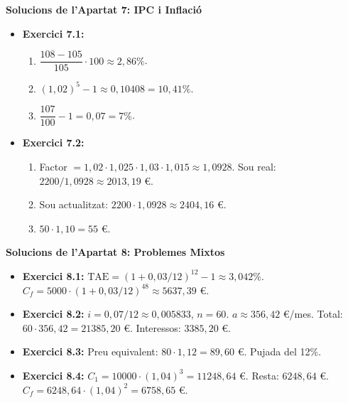 \documentclass[12pt]{article}
\begin{document}
\begin{solucio}
\textbf{Solucions de l'Apartat 7: IPC i Inflació}
\begin{itemize}
    \item \textbf{Exercici 7.1:}
    \begin{enumerate}[label=\alph*)]
        \item $\dfrac{108-105}{105} \cdot 100 \approx 2{,}86\%$.
        \item $(1{,}02)^5 - 1 \approx 0{,}10408 = 10{,}41\%$.
        \item $\dfrac{107}{100} - 1 = 0{,}07 = 7\%$.
    \end{enumerate}
    \item \textbf{Exercici 7.2:}
    \begin{enumerate}[label=\alph*)]
        \item Factor $= 1{,}02 \cdot 1{,}025 \cdot 1{,}03 \cdot 1{,}015 \approx 1{,}0928$. Sou real: $2200/1{,}0928 \approx 2013{,}19$ €.
        \item Sou actualitzat: $2200 \cdot 1{,}0928 \approx 2404{,}16$ €.
        \item $50 \cdot 1{,}10 = 55$ €.
    \end{enumerate}
\end{itemize}
\end{solucio}

\begin{solucio}
\textbf{Solucions de l'Apartat 8: Problemes Mixtos}
\begin{itemize}
    \item \textbf{Exercici 8.1:} $\text{TAE} = (1+0{,}03/12)^{12}-1 \approx 3{,}042\%$. $C_f = 5000 \cdot (1+0{,}03/12)^{48} \approx 5637{,}39$ €.
    \item \textbf{Exercici 8.2:} $i = 0{,}07/12 \approx 0{,}005833$, $n = 60$. $a \approx 356{,}42$ €/mes. Total: $60 \cdot 356{,}42 = 21385{,}20$ €. Interessos: $3385{,}20$ €.
    \item \textbf{Exercici 8.3:} Preu equivalent: $80 \cdot 1{,}12 = 89{,}60$ €. Pujada del 12\%.
    \item \textbf{Exercici 8.4:} $C_1 = 10000 \cdot (1{,}04)^3 = 11248{,}64$ €. Resta: $6248{,}64$ €. $C_f = 6248{,}64 \cdot (1{,}04)^2 = 6758{,}65$ €.
\end{itemize}
\end{solucio}
\end{document}
